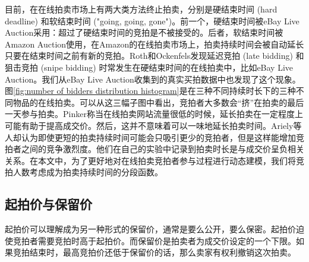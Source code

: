 \begin{figure}
   \centering
 \end{figure}

目前，在在线拍卖市场上有两大类方法终止拍卖，分别是硬结束时间 (hard deadline) 和软结束时间 ("going, going, gone")。前一个，硬结束时间被eBay Live Auction采用：超过了硬结束时间的竞拍是不被接受的。后者，软结束时间被Amazon Auction使用\cite{amazonauction}，在Amazon的在线拍卖市场上，拍卖持续时间会被自动延长只要在结束时间之前有新的竞拍。Roth和Ockenfels\cite{Roth2002Last}发现延迟竞拍 (late bidding) 和狙击竞拍 (snipe bidding) 时常发生在硬结束时间的在线拍卖中，比如eBay Live Auction。我们从eBay Live Auction收集到的真实买拍数据中也发现了这个现象。图\ref{fig:number of bidders distribution histogram}是在三种不同持续时长下的三种不同物品的在线拍卖。可以从这三幅子图中看出，竞拍者大多数会“挤”在拍卖的最后一天参与拍卖。Pinker\cite{Pinker2003Managing}称当在线拍卖网站流量很低的时候，延长拍卖在一定程度上可能有助于提高成交价。然后，这并不意味着可以一味地延长拍卖时间。Ariely等人\cite{Dan2003Buying}却认为即使更短的拍卖持续时间可能会只吸引更少的竞拍者，但是这样能增加竞拍者之间的竞争激烈度。他们在自己的实验中记录到拍卖时长是与成交价呈负相关关系。在本文中，为了更好地对在线拍卖竞拍者参与过程进行动态建模，我们将竞拍人数考虑成为拍卖持续时间的分段函数。

\subsection{起拍价与保留价}

起拍价可以理解成为另一种形式的保留价，通常是要么公开，要么保密。起拍价迫使竞拍者需要竞拍时高于起拍价。而保留价是拍卖者为成交价设定的一个下限。如果竞拍结束时，最高竞拍价还低于保留价的话，那么卖家有权利撤销这次拍卖。

